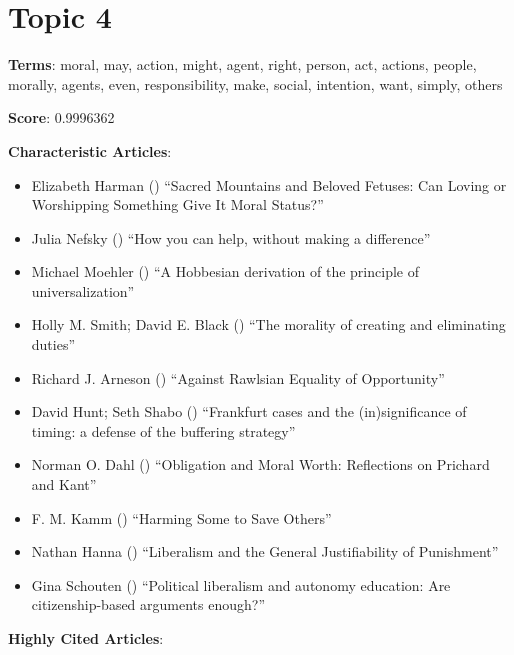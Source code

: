 \documentclass[
  10pt,
  letterpaper,
  DIV=11,
  numbers=noendperiod,
  twoside]{scrartcl}
\providecommand{\tightlist}{%
  \setlength{\itemsep}{0pt}\setlength{\parskip}{0pt}}\usepackage{longtable,booktabs,array}
\begin{document}
\section{Topic 4}\label{topic-4}

\textbf{Terms}: moral, may, action, might, agent, right, person, act,
actions, people, morally, agents, even, responsibility, make, social,
intention, want, simply, others

\textbf{Score}: 0.9996362

\textbf{Characteristic Articles}:

\begin{itemize}
\tightlist
\item
  Elizabeth Harman () ``Sacred
  Mountains and Beloved Fetuses: Can Loving or Worshipping Something
  Give It Moral Status?''
\item
  Julia Nefsky () ``How you can
  help, without making a difference''
\item
  Michael Moehler () ``A
  Hobbesian derivation of the principle of universalization''
\item
  Holly M. Smith; David E. Black
  ()
  ``The morality of creating and eliminating duties''
\item
  Richard J. Arneson () ``Against
  Rawlsian Equality of Opportunity''
\item
  David Hunt; Seth Shabo ()
  ``Frankfurt cases and the (in)significance of timing: a defense of the
  buffering strategy''
\item
  Norman O. Dahl () ``Obligation
  and Moral Worth: Reflections on Prichard and Kant''
\item
  F. M. Kamm () ``Harming Some to
  Save Others''
\item
  Nathan Hanna () ``Liberalism
  and the General Justifiability of Punishment''
\item
  Gina Schouten
  ()
  ``Political liberalism and autonomy education: Are citizenship-based
  arguments enough?''
\end{itemize}

\textbf{Highly Cited Articles}:
\end{document}
